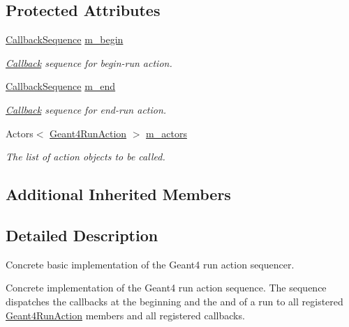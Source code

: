 \subsection*{Protected Attributes}
\begin{DoxyCompactItemize}
\item 
\hyperlink{struct_d_d4hep_1_1_callback_sequence}{Callback\+Sequence} \hyperlink{class_d_d4hep_1_1_simulation_1_1_geant4_run_action_sequence_a833ebd7f7da62ebeeb561815387b0bbe}{m\+\_\+begin}
\begin{DoxyCompactList}\small\item\em \hyperlink{class_d_d4hep_1_1_callback}{Callback} sequence for begin-\/run action. \end{DoxyCompactList}\item 
\hyperlink{struct_d_d4hep_1_1_callback_sequence}{Callback\+Sequence} \hyperlink{class_d_d4hep_1_1_simulation_1_1_geant4_run_action_sequence_a94c03005b1c789e05144558c840737f6}{m\+\_\+end}
\begin{DoxyCompactList}\small\item\em \hyperlink{class_d_d4hep_1_1_callback}{Callback} sequence for end-\/run action. \end{DoxyCompactList}\item 
Actors$<$ \hyperlink{class_d_d4hep_1_1_simulation_1_1_geant4_run_action}{Geant4\+Run\+Action} $>$ \hyperlink{class_d_d4hep_1_1_simulation_1_1_geant4_run_action_sequence_a780b499622542d52941141b108ab1258}{m\+\_\+actors}
\begin{DoxyCompactList}\small\item\em The list of action objects to be called. \end{DoxyCompactList}\end{DoxyCompactItemize}
\subsection*{Additional Inherited Members}


\subsection{Detailed Description}
Concrete basic implementation of the Geant4 run action sequencer. 

Concrete implementation of the Geant4 run action sequence. The sequence dispatches the callbacks at the beginning and the and of a run to all registered \hyperlink{class_d_d4hep_1_1_simulation_1_1_geant4_run_action}{Geant4\+Run\+Action} members and all registered callbacks.

